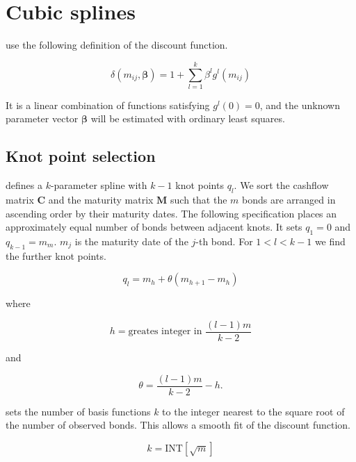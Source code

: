 \newpage
\section{Cubic splines}
\label{sec:cubic-splines}

\cite{McCulloch1971, McCulloch1975} use the following definition of the discount function.

\begin{equation}
  \label{eq:df_spline}
  \delta(m_{ij},\bm{\beta})=1+\sum_{l=1}^k\beta^lg^l(m_{ij})
\end{equation}

It is a linear combination of functions satisfying $g^l(0)=0$, and the unknown parameter vector $\bm{\beta}$ will be estimated with ordinary least squares.

\subsection{Knot point selection}

\cite{McCulloch1975} defines a $k$-parameter spline with $k-1$ knot points $q_l$. We sort the cashflow matrix $\bm{C}$ and the maturity matrix $\bm{M}$ such that the $m$ bonds are arranged in ascending order by their maturity dates. The following specification places an approximately equal number of bonds between adjacent knots. It sets $q_1=0$ and $q_{k-1}=m_m$. $m_j$ is the maturity date of the $j$-th bond. For $1<l<k-1$ we find the further knot points.

\begin{equation*}
  \label{eq:A.1a}
  q_l = m_h+\theta(m_{h+1}-m_h)
\end{equation*}

where

\begin{equation*}
 \label{eq:A.1b}
  h = \mbox{greates integer in }\frac{(l-1)m}{k-2}
\end{equation*}

and

\begin{equation*}
  \label{eq:A.1c}
  \theta = \frac{(l-1)m}{k-2}-h.
\end{equation*}

\cite{McCulloch1971} sets the  number of basis functions $k$ to the integer nearest to the square root of the number of observed bonds. This allows a smooth fit of the discount function.

\begin{equation*}
  \label{eq:nofknots}
  k = \mbox{INT}\left[\sqrt{m}\right]
\end{equation*}


